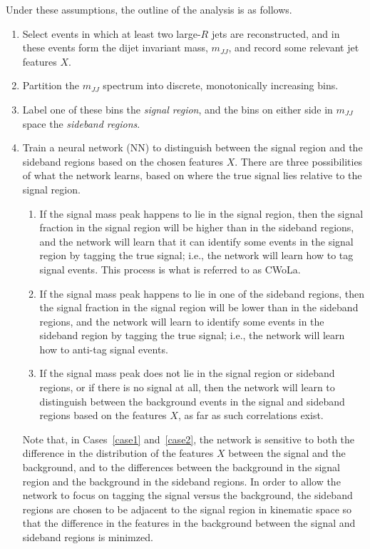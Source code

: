 Under these assumptions, the outline of the analysis is as follows.
\begin{enumerate}
  \item Select events in which at least two large-$R$ jets are reconstructed, and in these events form the dijet invariant mass, $m_{JJ}$, and record some relevant jet features $X$.
  \item Partition the $m_{JJ}$ spectrum into discrete, monotonically increasing bins.
  \item Label one of these bins the \textit{signal region}, and the bins on either side in $m_{JJ}$ space the \textit{sideband regions}.~\label{step3}
  \item Train a neural network (NN) to distinguish between the signal region and the sideband regions based on the chosen features $X$.
    There are three possibilities of what the network learns, based on where the true signal lies relative to the signal region.
    \begin{enumerate}
      \item If the signal mass peak happens to lie in the signal region, then the signal fraction in the signal region will be higher than in the sideband regions, and the network will learn that it can identify some events in the signal region by tagging the true signal; i.e., the network will learn how to tag signal events.
        This process is what is referred to as CWoLa.\label{case1}
      \item If the signal mass peak happens to lie in one of the sideband regions, then the signal fraction in the signal region will be lower than in the sideband regions, and the network will learn to identify some events in the sideband region by tagging the true signal; i.e., the network will learn how to anti-tag signal events.\label{case2}
      \item If the signal mass peak does not lie in the signal region or sideband regions, or if there is no signal at all, then the network will learn to distinguish between the background events in the signal and sideband regions based on the features $X$, as far as such correlations exist.\label{case3}
    \end{enumerate}
    Note that, in Cases~\ref{case1} and~\ref{case2}, the network is sensitive to both the difference in the distribution of the features $X$ between the signal and the background, and to the differences between the background in the signal region and the background in the sideband regions.
    In order to allow the network to focus on tagging the signal versus the background, the sideband regions are chosen to be adjacent to the signal region in kinematic space so that the difference in the features in the background between the signal and sideband regions is minimzed.

\end{enumerate}
